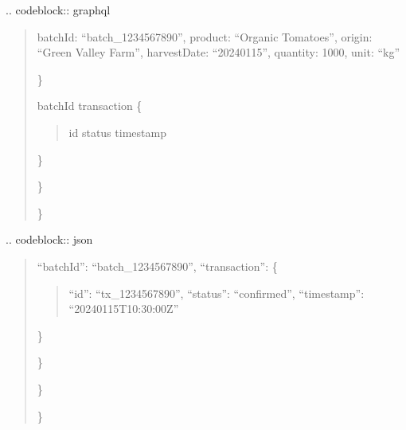 \documentclass[letterpaper,10pt,english]{sphinxmanual}
\begin{document}
\sphinxAtStartPar
{}
.. code\sphinxhyphen{}block:: graphql
\begin{quote}
\begin{description}
\begin{description}
\begin{description}
\sphinxAtStartPar
batchId: “batch\_1234567890”,
product: “Organic Tomatoes”,
origin: “Green Valley Farm”,
harvestDate: “2024\sphinxhyphen{}01\sphinxhyphen{}15”,
quantity: 1000,
unit: “kg”

\end{description}

\sphinxAtStartPar
\}

\sphinxlineitem{) \{}
\sphinxAtStartPar
batchId
transaction \{
\begin{quote}

\sphinxAtStartPar
id
status
timestamp
\end{quote}

\sphinxAtStartPar
\}

\end{description}

\sphinxAtStartPar
\}

\end{description}

\sphinxAtStartPar
\}
\end{quote}

\sphinxAtStartPar
{}
.. code\sphinxhyphen{}block:: json
\begin{quote}
\begin{description}
\sphinxlineitem{\{}\begin{description}
\begin{description}
\sphinxAtStartPar
“batchId”: “batch\_1234567890”,
“transaction”: \{
\begin{quote}

\sphinxAtStartPar
“id”: “tx\_1234567890”,
“status”: “confirmed”,
“timestamp”: “2024\sphinxhyphen{}01\sphinxhyphen{}15T10:30:00Z”
\end{quote}

\sphinxAtStartPar
\}

\end{description}

\sphinxAtStartPar
\}

\end{description}

\sphinxAtStartPar
\}

\end{description}

\sphinxAtStartPar
\}
\end{quote}
\end{document}
